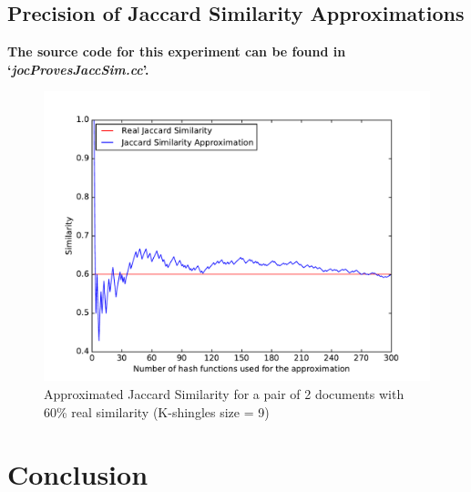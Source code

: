 \documentclass[12pt]{article}
\begin{document}

\subsection{Precision of Jaccard Similarity Approximations}
\textbf{The source code for this experiment can be found in `\textit{jocProvesJaccSim.cc}'.}
\bigskip


\begin{figure}[H]
	\centering
	\includegraphics[scale=0.55]{graphs/JaccardSimilarityVsApproximation.pdf}
	\caption{Approximated Jaccard Similarity for a pair of 2 documents with 60\% real similarity (K-shingles size = 9)}
	\label{fig:JaccardVsApprox}
\end{figure}

\clearpage
\section{Conclusion}

\end{document}
